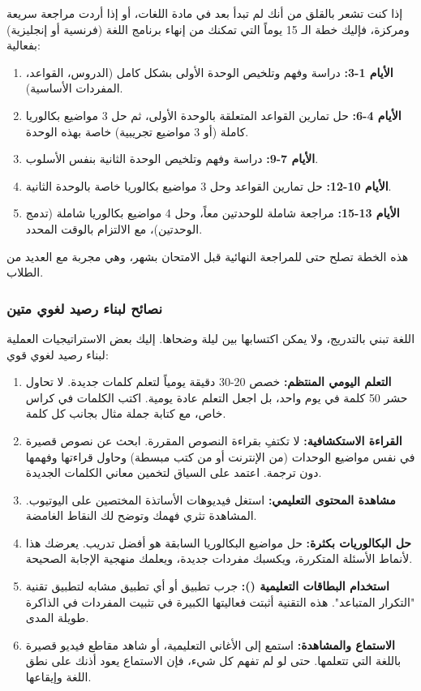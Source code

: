 \documentclass[12pt,a4paper]{book}
\begin{document}
	إذا كنت تشعر بالقلق من أنك لم تبدأ بعد في مادة اللغات، أو إذا أردت مراجعة سريعة ومركزة، فإليك خطة الـ 15 يوماً التي تمكنك من إنهاء برنامج اللغة (فرنسية أو إنجليزية) بفعالية:
	
	\begin{enumerate}
		\item \textbf{الأيام 1-3:} دراسة وفهم وتلخيص الوحدة الأولى بشكل كامل (الدروس، القواعد، المفردات الأساسية).
		\item \textbf{الأيام 4-6:} حل تمارين القواعد المتعلقة بالوحدة الأولى، ثم حل 3 مواضيع بكالوريا كاملة (أو 3 مواضيع تجريبية) خاصة بهذه الوحدة.
		\item \textbf{الأيام 7-9:} دراسة وفهم وتلخيص الوحدة الثانية بنفس الأسلوب.
		\item \textbf{الأيام 10-12:} حل تمارين القواعد وحل 3 مواضيع بكالوريا خاصة بالوحدة الثانية.
		\item \textbf{الأيام 13-15:} مراجعة شاملة للوحدتين معاً، وحل 4 مواضيع بكالوريا شاملة (تدمج الوحدتين)، مع الالتزام بالوقت المحدد.
	\end{enumerate}
	
	هذه الخطة تصلح حتى للمراجعة النهائية قبل الامتحان بشهر، وهي مجربة مع العديد من الطلاب.
	
	\subsubsection{نصائح لبناء رصيد لغوي متين}
	\label{sec:random-tips12}
	
	اللغة تبني بالتدريج، ولا يمكن اكتسابها بين ليلة وضحاها. إليك بعض الاستراتيجيات العملية لبناء رصيد لغوي قوي:
	
	\begin{enumerate}
		\item \textbf{التعلم اليومي المنتظم:} خصص 20-30 دقيقة يومياً لتعلم كلمات جديدة. لا تحاول حشر 50 كلمة في يوم واحد، بل اجعل التعلم عادة يومية. اكتب الكلمات في كراس خاص، مع كتابة جملة مثال بجانب كل كلمة.
		\item \textbf{القراءة الاستكشافية:} لا تكتفِ بقراءة النصوص المقررة. ابحث عن نصوص قصيرة في نفس مواضيع الوحدات (من الإنترنت أو من كتب مبسطة) وحاول قراءتها وفهمها دون ترجمة. اعتمد على السياق لتخمين معاني الكلمات الجديدة.
		\item \textbf{مشاهدة المحتوى التعليمي:} استغل فيديوهات الأساتذة المختصين على اليوتيوب. المشاهدة تثري فهمك وتوضح لك النقاط الغامضة.
		\item \textbf{حل البكالوريات بكثرة:} حل مواضيع البكالوريا السابقة هو أفضل تدريب. يعرضك هذا لأنماط الأسئلة المتكررة، ويكسبك مفردات جديدة، ويعلمك منهجية الإجابة الصحيحة.
		\item \textbf{استخدام البطاقات التعليمية ():} جرب تطبيق  أو أي تطبيق مشابه لتطبيق تقنية "التكرار المتباعد". هذه التقنية أثبتت فعاليتها الكبيرة في تثبيت المفردات في الذاكرة طويلة المدى.
		\item \textbf{الاستماع والمشاهدة:} استمع إلى الأغاني التعليمية، أو شاهد مقاطع فيديو قصيرة باللغة التي تتعلمها. حتى لو لم تفهم كل شيء، فإن الاستماع يعود أذنك على نطق اللغة وإيقاعها.
	\end{enumerate}
	
\end{document}
